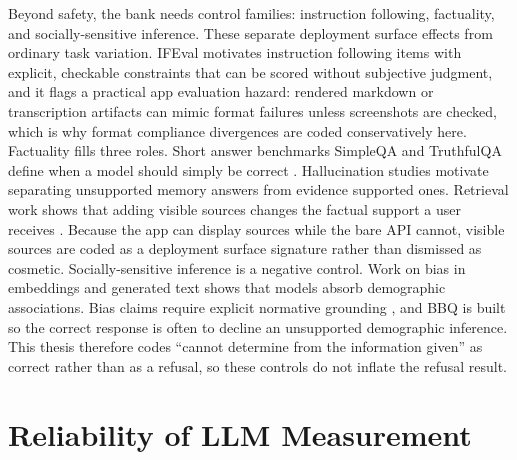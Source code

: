 Beyond safety, the bank needs control families: instruction following,
factuality, and socially-sensitive inference. These separate deployment surface
effects from ordinary task variation. IFEval
\parencite{ifeval} motivates instruction following items with explicit, checkable
constraints that can be scored without subjective judgment, and it flags a
practical app evaluation hazard: rendered markdown or transcription artifacts can
mimic format failures unless screenshots are checked, which is why format compliance
divergences are coded conservatively here. Factuality fills three roles.
Short answer benchmarks SimpleQA and TruthfulQA define when a model should
simply be correct \parencite{simpleqa,truthfulqa}.
Hallucination studies
\parencite{maynez_factuality,hallucination_survey,factscore,selfcheckgpt}
motivate separating unsupported memory answers from evidence supported ones.
Retrieval work shows that adding visible sources changes the factual support a
user receives \parencite{dpr,rag,webgpt,verified_quotes,blenderbot2}. Because the app can
display sources while the bare API cannot, visible sources are coded as a
deployment surface signature rather than dismissed as cosmetic. Socially-sensitive
inference is a negative control. Work on bias in embeddings and generated text
\parencite{caliskan_bias,debiasing_embeddings,sheng_bias,realtoxicityprompts}
shows that models absorb demographic associations. Bias claims require explicit
normative grounding \parencite{blodgett_survey}, and BBQ \parencite{bbq} is
built so the correct response is often to decline an
unsupported demographic inference. This thesis therefore codes ``cannot
determine from the information given'' as correct rather than as a refusal, so
these controls do not inflate the refusal result.

\section{Reliability of LLM Measurement}
\label{sec:llm-measurement-reliability}

